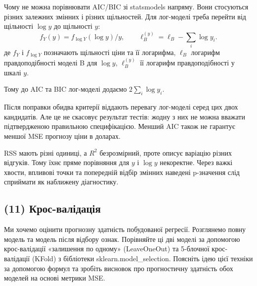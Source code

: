 Чому не можна порівнювати AIC/BIC зі statsmodels напряму. Вони
стосуються різних залежних змінних і різних щільностей. Для лог-моделі
треба перейти від щільності \(\log y\) до щільності \(y\):
\[f_Y(y)=f_{\log Y}(\log y)/y,\qquad \ell_B^{(y)}=\ell_B-\sum_i\log y_i.\]
де \(f_Y\) і \(f_{\log Y}\) позначають щільності ціни та її логарифма,
\(\ell_B\) логарифм правдоподібності моделі B для \(\log y\),
\(\ell_B^{(y)}\) її логарифм правдоподібності у шкалі \(y\).

Тому до AIC та BIC лог-моделі додаємо \(2\sum_i\log y_i\).

Після поправки обидва критерії віддають перевагу лог-моделі серед цих
двох кандидатів. Але це не скасовує результат тестів: жодну з них не
можна вважати підтвердженою правильною специфікацією. Менший AIC також
не гарантує меншої MSE прогнозу ціни в доларах.

RSS мають різні одиниці, а \(R^2\) безрозмірний, проте описує варіацію
різних відгуків. Тому їхнє пряме порівняння для \(y\) і \(\log y\)
некоректне. Через важкі хвости, впливові точки та попередній відбір
змінних наведені p-значення слід сприймати як наближену діагностику.


\Needspace{212.0pt}

\subsection{(11) Крос-валідація}

\begin{taskstatement}
Ми хочемо оцінити прогнозну здатність побудованої регресії. Розглянемо
повну модель та модель після відбору ознак. Порівняйте ці дві моделі за
допомогою крос-валідації «залишення по одному» (LeaveOneOut) та
5-блочної крос-валідації (KFold) з бібліотеки sklearn.model\_selection.
Поясніть ідею цієї техніки за допомогою формул та зробіть висновок про
прогностичну здатність обох моделей на основі метрики MSE.
\end{taskstatement}



